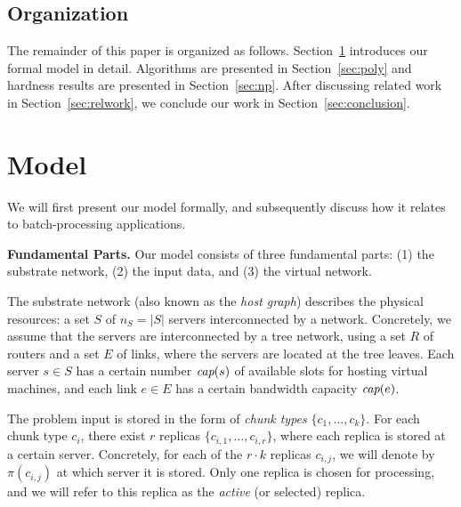 \documentclass[9pt,twocolumn]{scrartcl}
\newcommand{\achunk}{\ensuremath{c}}
\newcommand{\capacity}{\emph{cap}}
\begin{document}
\subsection{Organization}

The remainder of this paper is organized as follows.
Section~\ref{sec:model} introduces our formal model in detail.
Algorithms are presented in Section~\ref{sec:poly} and
hardness results are presented in Section~\ref{sec:np}.
After discussing related work in Section~\ref{sec:relwork},
we conclude our work in Section~\ref{sec:conclusion}.


\section{Model}\label{sec:model}

We will first present our model formally, and subsequently discuss how it relates
to batch-processing applications.

\textbf{Fundamental Parts.} Our model consists of three fundamental parts: (1) the substrate network,
(2) the input data, and
(3) the virtual network.

The substrate network (also known as the \emph{host graph}) describes the physical resources:
a set $S$ of $n_S=|S|$ servers interconnected by a network. Concretely, we assume
that the servers are interconnected by a tree network, using a set $R$ of routers and a set $E$ of links,
where the servers are located at the tree leaves. Each server $s\in S$ has a certain number
$\capacity(s)$ of available slots for hosting virtual machines, and each link $e\in E$ has a certain bandwidth
capacity $\capacity(e)$.

The problem input is stored in the form of \emph{chunk types} $\{\achunk_1, \ldots, \achunk_k\}$.  For each chunk type $\achunk_i$,
there exist $r$ replicas $\{\achunk_{i,1},\ldots, \achunk_{i,r}\}$, where each replica is stored at a certain server.
Concretely, for each of the $r\cdot k$ replicas $\achunk_{i,j}$, we will denote by $\pi(\achunk_{i,j})$ at
which server it is stored. Only one replica is chosen for processing, and we will refer to this
replica as the \emph{active} (or selected) replica.
\end{document}
